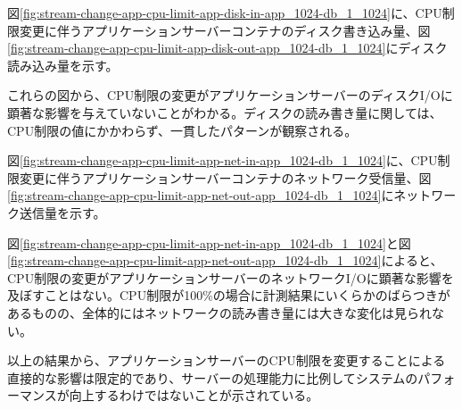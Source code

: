 \documentclass[../../../../main]{subfiles}
\begin{document}
    図\ref{fig:stream-change-app-cpu-limit-app-disk-in-app_1024-db_1_1024}に、CPU制限変更に伴うアプリケーションサーバーコンテナのディスク書き込み量、図\ref{fig:stream-change-app-cpu-limit-app-disk-out-app_1024-db_1_1024}にディスク読み込み量を示す。

    
    

    これらの図から、CPU制限の変更がアプリケーションサーバーのディスクI/Oに顕著な影響を与えていないことがわかる。ディスクの読み書き量に関しては、CPU制限の値にかかわらず、一貫したパターンが観察される。


    図\ref{fig:stream-change-app-cpu-limit-app-net-in-app_1024-db_1_1024}に、CPU制限変更に伴うアプリケーションサーバーコンテナのネットワーク受信量、図\ref{fig:stream-change-app-cpu-limit-app-net-out-app_1024-db_1_1024}にネットワーク送信量を示す。

    
    

    図\ref{fig:stream-change-app-cpu-limit-app-net-in-app_1024-db_1_1024}と図\ref{fig:stream-change-app-cpu-limit-app-net-out-app_1024-db_1_1024}によると、CPU制限の変更がアプリケーションサーバーのネットワークI/Oに顕著な影響を及ぼすことはない。CPU制限が100\%の場合に計測結果にいくらかのばらつきがあるものの、全体的にはネットワークの読み書き量には大きな変化は見られない。

    以上の結果から、アプリケーションサーバーのCPU制限を変更することによる直接的な影響は限定的であり、サーバーの処理能力に比例してシステムのパフォーマンスが向上するわけではないことが示されている。
\end{document}
